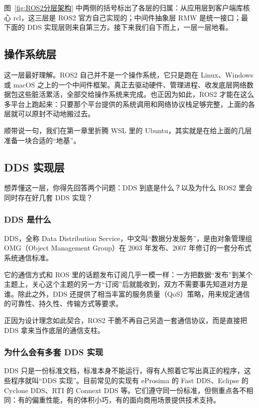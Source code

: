 \documentclass[12pt,a4paper]{ctexbook}
\begin{document}
图~\ref{fig:ROS2分层架构} 中两侧的括号标出了各层的归属：从应用层到客户端库核心 rcl，这三层是 ROS2 官方自己实现的；中间件抽象层 RMW 是统一接口；最下面的 DDS 实现层则来自第三方。接下来我们自下而上，一层一层地看。



\subsection{操作系统层}
这一层最好理解。ROS2 自己并不是一个操作系统，它只是跑在 Linux、Windows 或 macOS 之上的一个中间件框架。真正去驱动硬件、管理进程、收发底层网络数据包这些脏活累活，全部交给操作系统来完成。也正因为如此，ROS2 才能在这么多平台上跑起来：只要那个平台提供的系统调用和网络协议栈足够完整，上面的各层就可以原封不动地搬过去。

顺带说一句，我们在第一章里折腾 WSL 里的 Ubuntu，其实就是在给上面的几层准备一块合适的“地基”。

\subsection{DDS 实现层}
想弄懂这一层，你得先回答两个问题：DDS 到底是什么？以及为什么 ROS2 里会同时存在好几套 DDS 实现？

\subsubsection{DDS 是什么}

DDS，全称 Data Distribution Service，中文叫“数据分发服务”，是由对象管理组 OMG（Object Management Group）在 2003 年发布、2007 年修订的一套分布式系统通信标准。

它的通信方式和 ROS 里的话题发布订阅几乎一模一样：一方把数据“发布”到某个主题上，关心这个主题的另一方“订阅”后就能收到，双方不需要事先知道对方是谁。除此之外，DDS 还提供了相当丰富的服务质量（QoS）策略，用来规定通信的可靠性、持久性、传输方式等要求。

正因为设计理念如此契合，ROS2 干脆不再自己另造一套通信协议，而是直接把 DDS 拿来当作底层的通信支柱。

\subsubsection{为什么会有多套 DDS 实现}

DDS 只是一份标准文档，标准本身不能运行，得有人照着它写出真正的程序，这些程序就叫“DDS 实现”。目前常见的实现有 eProsima 的 Fast DDS、Eclipse 的 Cyclone DDS、RTI 的 Connext DDS 等。它们遵守同一份标准，但侧重点各不相同：有的偏重性能，有的体积小巧，有的面向商用场景提供技术支持。
\end{document}
